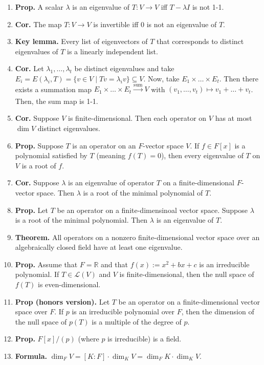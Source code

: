 \begin{enumerate}
	\item \textbf{Prop. } A scalar $\lambda$ is an eigenvalue of $T: V \to V$ iff $T-\lambda I$ is not 1-1. 
	\item \textbf{Cor. } The map $T: V \to V$ is invertible iff 0 is not an eigenvalue of $T$. 
	\item \textbf{Key lemma. } Every list of eigenvectors of $T$ that corresponds to distinct eigenvalues of $T$ is a linearly independent list. 
	\item \textbf{Cor. } Let $\lambda_1,\dots,\lambda_t$ be distinct eigenvalues and take $E_i = E(\lambda_i,T) = \{v \in V \mid Tv = \lambda_iv\} \subseteq V$. Now, take $E_1 \times \dots \times E_t$. Then there exists a summation map $E_1 \times \dots \times E_t \xrightarrow[]{\textrm{sum}} V$ with $(v_1,\dots,v_t) \mapsto v_1 + \dots + v_t$. Then, the sum map is 1-1. 
	\item \textbf{Cor. } Suppose $V$ is finite-dimensional. Then each operator on $V$ has at most $\dim V$ distinct eigenvalues. 
	\item \textbf{Prop. } Suppose $T$ is an operator on an $F$-vector space $V$. If $f \in F[x]$ is a polynomial satisfied by $T$ (meaning $f(T)=0$), then every eigenvalue of $T$ on $V$ is a root of $f$. 
	\item \textbf{Cor. } Suppose $\lambda$ is an eigenvalue of operator $T$ on a finite-dimensional $F$-vector space. Then $\lambda$ is a root of the minimal polynomial of $T$. 
	\item \textbf{Prop. } Let $T$ be an operator on a finite-dimensinoal vector space. Suppose $\lambda$ is a root of the minimal polynomial. Then $\lambda$ is an eigenvalue of $T$. 
	\item \textbf{Theorem. } All operators on a nonzero finite-dimensional vector space over an algebraically closed field have at least one eigenvalue. 
	\item \textbf{Prop. } Assume that $F = \mathbb{R}$ and that $f(x) := x^2 + bx + c$ is an irreducible polynomial. If $T \in \mathscr{L}(V)$ and $V$ is finite-dimensional, then the null space of $f(T)$ is even-dimensional. 
	\item \textbf{Prop (honors version). } Let $T$ be an operator on a finite-dimensional vector space over $F$. If $p$ is an irreducible polynomial over $F$, then the dimension of the null space of $p(T)$ is a multiple of the degree of $p$. 
	\item \textbf{Prop. } $F[x] / (p)$ (where $p$ is irreducible) is a field. 
	\item \textbf{Formula. } $\dim_F V = [K:F] \cdot \dim_K V = \dim_F K \cdot \dim_K V$. 

\end{enumerate}
